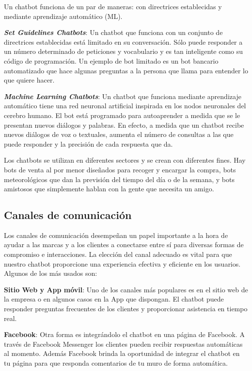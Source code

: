 Un chatbot funciona de un par de maneras: con directrices establecidas y mediante aprendizaje automático (ML).{\vspace{0.3cm}

\textit{\textbf{Set Guidelines Chatbots}}: Un chatbot que funciona con un conjunto de directrices establecidas está limitado en su conversación. Sólo puede responder a un número determinado de peticiones y vocabulario y es tan inteligente como su código de programación. Un ejemplo de bot limitado es un bot bancario automatizado que hace algunas preguntas a la persona que llama para entender lo que quiere hacer.{\vspace{0.3cm}


\textit{\textbf{Machine Learning Chatbots}}: Un chatbot que funciona mediante aprendizaje automático tiene una red neuronal artificial inspirada en los nodos neuronales del cerebro humano. El bot está programado para autoaprender a medida que se le presentan nuevos diálogos y palabras. En efecto, a medida que un chatbot recibe nuevos diálogos de voz o textuales, aumenta el número de consultas a las que puede responder y la precisión de cada respuesta que da.


Los chatbots se utilizan en diferentes sectores y se crean con diferentes fines. Hay bots de venta al por menor diseñados para recoger y encargar la compra, bots meteorológicos que dan la previsión del tiempo del día o de la semana, y bots amistosos que simplemente hablan con la gente que necesita un amigo.

\subsection{Canales de comunicación}

Los canales de comunicación desempeñan un papel importante a la hora de ayudar a las marcas y a los clientes a conectarse entre sí para diversas formas de compromiso e interacciones. La elección del canal adecuado es vital para que nuestro chatbot proporcione una experiencia efectiva y eficiente en los usuarios. Algunos de los más usados son:\vspace{0.3cm}

\textbf{Sitio Web y App móvil}: Uno de los canales más populares es en el sitio web de la empresa o en algunos casos en la App que dispongan. El chatbot puede responder preguntas frecuentes de los clientes y proporcionar asistencia en tiempo real.\vspace{0.3cm}

\textbf{Facebook}: Otra forma es integrándolo el chatbot en una página de Facebook. A través de Facebook Messenger los clientes pueden recibir respuestas automáticas al momento. Además Facebook brinda la oportunidad de integrar el chatbot en tu página para que responda comentarios de tu muro de forma automática.\vspace{0.3cm}

}}
